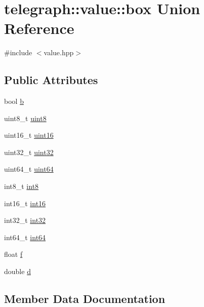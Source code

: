 \hypertarget{uniontelegraph_1_1value_1_1box}{}\section{telegraph\+:\+:value\+:\+:box Union Reference}
\label{uniontelegraph_1_1value_1_1box}


{\ttfamily \#include $<$value.\+hpp$>$}

\subsection*{Public Attributes}
\begin{DoxyCompactItemize}
\item 
bool \hyperlink{uniontelegraph_1_1value_1_1box_a773d309cd1ea162e79b23a5c2740d3ca}{b}
\item 
uint8\+\_\+t \hyperlink{uniontelegraph_1_1value_1_1box_a6e38aea03750a4c9c7522e594283b2ce}{uint8}
\item 
uint16\+\_\+t \hyperlink{uniontelegraph_1_1value_1_1box_a392a61cac39516bc401cd1427b0e22c5}{uint16}
\item 
uint32\+\_\+t \hyperlink{uniontelegraph_1_1value_1_1box_a7958c8ceae9c990e125e2f8a7b091b9c}{uint32}
\item 
uint64\+\_\+t \hyperlink{uniontelegraph_1_1value_1_1box_a341188a3d0394952087c040a762cc9b1}{uint64}
\item 
int8\+\_\+t \hyperlink{uniontelegraph_1_1value_1_1box_ad62206e65aff90a2862a4cf4d900e46e}{int8}
\item 
int16\+\_\+t \hyperlink{uniontelegraph_1_1value_1_1box_acec67f829d07fe989cbd92c86eae3fbf}{int16}
\item 
int32\+\_\+t \hyperlink{uniontelegraph_1_1value_1_1box_a859928ebf250132bb3581c4a5d475dae}{int32}
\item 
int64\+\_\+t \hyperlink{uniontelegraph_1_1value_1_1box_a6edba3f696e6313f554d9716d2ad0a44}{int64}
\item 
float \hyperlink{uniontelegraph_1_1value_1_1box_a6c9dcd975e27dafe6dc21240a3c55f56}{f}
\item 
double \hyperlink{uniontelegraph_1_1value_1_1box_a7570fa6e7a04baf8876387503765391c}{d}
\end{DoxyCompactItemize}


\subsection{Member Data Documentation}
\mbox{\label{uniontelegraph_1_1value_1_1box_a773d309cd1ea162e79b23a5c2740d3ca}} 
